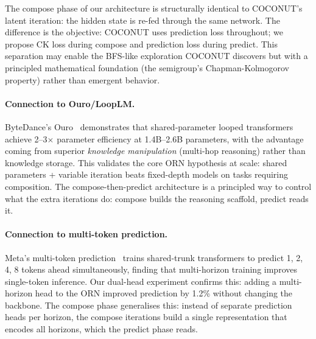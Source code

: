 \documentclass[11pt, a4paper]{article}
\theoremstyle{plain}
\theoremstyle{definition}
\theoremstyle{remark}
\begin{document}
The compose phase of our architecture is structurally identical to COCONUT's latent iteration: the hidden state is re-fed through the same network.
The difference is the objective: COCONUT uses prediction loss throughout; we propose CK loss during compose and prediction loss during predict.
This separation may enable the BFS-like exploration COCONUT discovers but with a principled mathematical foundation (the semigroup's Chapman-Kolmogorov property) rather than emergent behavior.

\paragraph{Connection to Ouro/LoopLM.}
ByteDance's Ouro~\cite{ouro2025} demonstrates that shared-parameter looped transformers achieve 2--3$\times$ parameter efficiency at 1.4B--2.6B parameters, with the advantage coming from superior \emph{knowledge manipulation} (multi-hop reasoning) rather than knowledge storage.
This validates the core ORN hypothesis at scale: shared parameters + variable iteration beats fixed-depth models on tasks requiring composition.
The compose-then-predict architecture is a principled way to control what the extra iterations do: compose builds the reasoning scaffold, predict reads it.

\paragraph{Connection to multi-token prediction.}
Meta's multi-token prediction~\cite{meta_mtp2024} trains shared-trunk transformers to predict 1, 2, 4, 8 tokens ahead simultaneously, finding that multi-horizon training improves single-token inference.
Our dual-head experiment confirms this: adding a multi-horizon head to the ORN improved prediction by 1.2\% without changing the backbone.
The compose phase generalises this: instead of separate prediction heads per horizon, the compose iterations build a single representation that encodes all horizons, which the predict phase reads.
\end{document}
